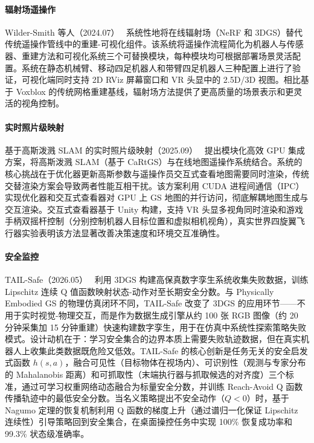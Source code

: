 \paragraph{辐射场遥操作}

Wilder-Smith 等人（2024.07）~\cite{2407_20194} 系统性地将在线辐射场（NeRF 和 3DGS）替代传统遥操作管线中的重建-可视化组件。该系统将遥操作流程简化为机器人与传感器、重建方法和可视化系统三个可替换模块，每种模块均可根据部署场景灵活配置。系统在静态机械臂、移动四足机器人和带臂四足机器人三种配置上进行了验证，可视化端同时支持 2D RViz 屏幕窗口和 VR 头显中的 2.5D/3D 视图。相比基于 Voxblox 的传统网格重建基线，辐射场方法提供了更高质量的场景表示和更灵活的视角控制。

\paragraph{实时照片级映射}

基于高斯泼溅 SLAM 的实时照片级映射（2025.09）~\cite{2509_06433} 提出模块化高效 GPU 集成方案，将高斯泼溅 SLAM（基于 CaRtGS）与在线地图遥操作系统结合。系统的核心挑战在于优化器更新高斯参数与遥操作员交互式查看地图需要同时渲染，传统交替渲染方案会导致两者性能互相干扰。该方案利用 CUDA 进程间通信（IPC）实现优化器和交互式查看器对 GPU 上 GS 地图的并行访问，彻底解耦地图生成与交互渲染。交互式查看器基于 Unity 构建，支持 VR 头显多视角同时渲染和游戏手柄双摇杆控制（分别控制机器人目标位置和虚拟相机视角），真实世界四旋翼飞行器实验表明该方法显著改善决策速度和环境交互准确性。

\paragraph{安全监控}

TAIL-Safe（2026.05）~\cite{2605_01195} 利用 3DGS 构建高保真数字孪生系统收集失败数据，训练 Lipschitz 连续 Q 值函数映射状态-动作对至长期安全分数。与 Physically Embodied GS 的物理仿真闭环不同，TAIL-Safe 改变了 3DGS 的应用环节——不用于实时视觉-物理交互，而是作为数据生成引擎从约 100 张 RGB 图像（约 20 分钟采集加 15 分钟重建）快速构建数字孪生，用于在仿真中系统性探索策略失败模式。设计动机在于：学习安全集合的边界本质上需要失败轨迹数据，但在真实机器人上收集此类数据既危险又低效。TAIL-Safe 的核心创新是任务无关的安全启发式函数 $h(s,a)$，融合可见性（目标物体在视场内）、可识别性（观测与专家分布的 Mahalanobis 距离）和可抓取性（末端执行器与抓取候选的对齐度）三个标准，通过可学习权重网络动态融合为标量安全分数，并训练 Reach-Avoid Q 函数传播轨迹中的最低安全分数。当名义策略提出不安全动作（$Q < 0$）时，基于 Nagumo 定理的恢复机制利用 Q 函数的梯度上升（通过谱归一化保证 Lipschitz 连续性）引导策略回到安全集合，在桌面操控任务中实现 100\% 恢复成功率和 99.3\% 状态级准确率。

